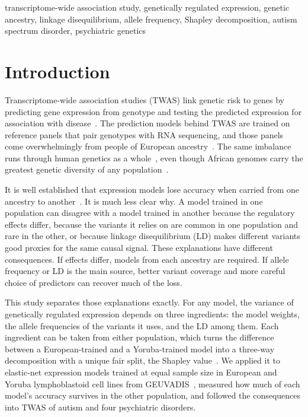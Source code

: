 \documentclass[conference]{IEEEtran}
\begin{document}
\begin{IEEEkeywords}
transcriptome-wide association study, genetically regulated expression, genetic ancestry, linkage disequilibrium, allele frequency, Shapley decomposition, autism spectrum disorder, psychiatric genetics
\end{IEEEkeywords}

\section{Introduction}

Transcriptome-wide association studies (TWAS) link genetic risk to genes by predicting gene expression from genotype and testing the predicted expression for association with disease~\cite{gamazon2015,gusev2016,barbeira2018}. The prediction models behind TWAS are trained on reference panels that pair genotypes with RNA sequencing, and those panels come overwhelmingly from people of European ancestry~\cite{gtex2020,wang2018}. The same imbalance runs through human genetics as a whole~\cite{popejoy2016,sirugo2019}, even though African genomes carry the greatest genetic diversity of any population~\cite{campbell2008,gurdasani2015}.

It is well established that expression models lose accuracy when carried from one ancestry to another~\cite{mogil2018,mikhaylova2019,keys2020}. It is much less clear why. A model trained in one population can disagree with a model trained in another because the regulatory effects differ, because the variants it relies on are common in one population and rare in the other, or because linkage disequilibrium (LD) makes different variants good proxies for the same causal signal. These explanations have different consequences. If effects differ, models from each ancestry are required. If allele frequency or LD is the main source, better variant coverage and more careful choice of predictors can recover much of the loss.

This study separates those explanations exactly. For any model, the variance of genetically regulated expression depends on three ingredients: the model weights, the allele frequencies of the variants it uses, and the LD among them. Each ingredient can be taken from either population, which turns the difference between a European-trained and a Yoruba-trained model into a three-way decomposition with a unique fair split, the Shapley value~\cite{shapley1953,owen2014}. We applied it to elastic-net expression models trained at equal sample size in European and Yoruba lymphoblastoid cell lines from GEUVADIS~\cite{lappalainen2013}, measured how much of each model's accuracy survives in the other population, and followed the consequences into TWAS of autism and four psychiatric disorders.
\end{document}

